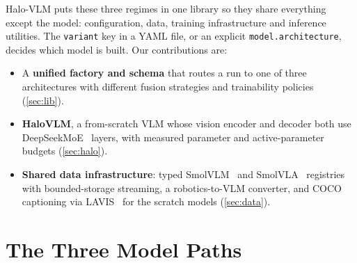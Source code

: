 \documentclass[11pt]{article}
\begin{document}
Halo-VLM puts these three regimes in one library so they share everything except the
model: configuration, data, training infrastructure and inference utilities. The
\texttt{variant} key in a YAML file, or an explicit \texttt{model.architecture}, decides
which model is built. Our contributions are:
\begin{itemize}
  \item A \textbf{unified factory and schema} that routes a run to one of three
        architectures with different fusion strategies and trainability policies
        (\cref{sec:lib}).
  \item \textbf{HaloVLM}, a from-scratch VLM whose vision encoder and decoder both use
        DeepSeekMoE~\cite{dai2024deepseekmoe} layers, with measured parameter and
        active-parameter budgets (\cref{sec:halo}).
  \item \textbf{Shared data infrastructure}: typed SmolVLM~\cite{marafioti2025smolvlm} and
        SmolVLA~\cite{shukor2025smolvla} registries with bounded-storage streaming, a
        robotics-to-VLM converter, and COCO~\cite{lin2014coco} captioning via
        LAVIS~\cite{li2023lavis} for the scratch models (\cref{sec:data}).
\end{itemize}

\section{The Three Model Paths}
\label{sec:models}
\end{document}
